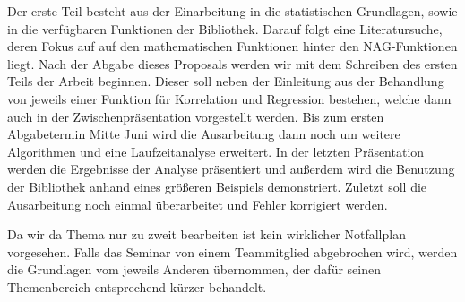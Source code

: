 \documentclass{article}
\begin{document}
Der erste Teil besteht aus der Einarbeitung in die statistischen Grundlagen, sowie in die verfügbaren Funktionen der Bibliothek.
Darauf folgt eine Literatursuche, deren Fokus auf auf den mathematischen Funktionen hinter den NAG-Funktionen liegt.
Nach der Abgabe dieses Proposals werden wir mit dem Schreiben des ersten Teils der Arbeit beginnen. 
Dieser soll neben der Einleitung aus der Behandlung von jeweils einer Funktion für Korrelation und Regression bestehen, welche dann auch in der Zwischenpräsentation vorgestellt werden.
Bis zum ersten Abgabetermin Mitte Juni wird die Ausarbeitung dann noch um weitere Algorithmen und eine Laufzeitanalyse erweitert.
In der letzten Präsentation werden die Ergebnisse der Analyse präsentiert und außerdem wird die Benutzung der Bibliothek anhand eines größeren Beispiels demonstriert.
Zuletzt soll die Ausarbeitung noch einmal überarbeitet und Fehler korrigiert werden.

Da wir da Thema nur zu zweit bearbeiten ist kein wirklicher Notfallplan vorgesehen. 
Falls das Seminar von einem Teammitglied abgebrochen wird, werden die Grundlagen vom jeweils Anderen übernommen, der dafür seinen Themenbereich entsprechend kürzer behandelt.


\end{document}
